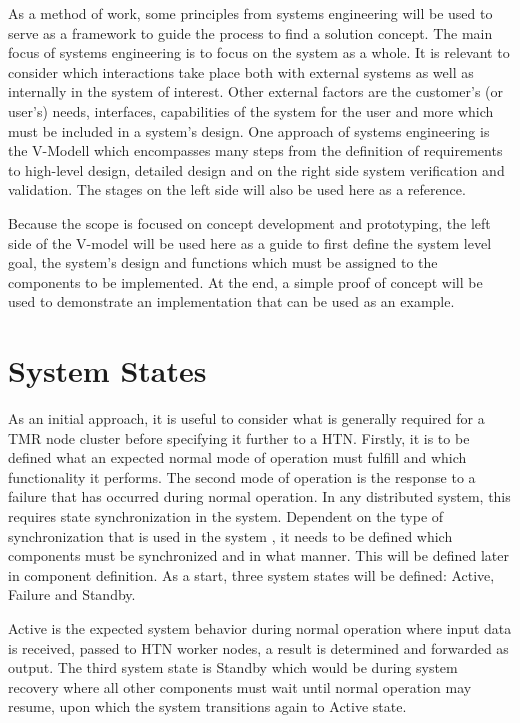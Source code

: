 
As a method of work, some principles from systems engineering will be used to serve as a framework to guide the process to find a solution concept. The main focus of systems engineering is to focus on the system as a whole. It is relevant to consider which interactions take place both with external systems as well as internally in the system of interest. Other external factors are the customer's (or user's) needs, interfaces, capabilities of the system for the user and more which must be included in a system's design. One approach of systems engineering is the V-Modell which encompasses many steps from the definition of requirements to high-level design, detailed design and on the right side system verification and validation. The stages on the left side will also be used here as a reference. \parencite{kossiakoff_systems_2020}

Because the scope is focused on concept development and prototyping, the left side of the V-model will be used here as a guide to first define the system level goal, the system's design and functions which must be assigned to the components to be implemented. At the end, a simple proof of concept will be used to demonstrate an implementation that can be used as an example.




\section{System States}

As an initial approach, it is useful to consider what is generally required for a TMR node cluster before specifying it further to a HTN. Firstly, it is to be defined what an expected normal mode of operation must fulfill and which functionality it performs. The second mode of operation is the response to a failure that has occurred during normal operation. In any distributed system, this requires state synchronization in the system. Dependent on the type of synchronization that is used in the system \parencite{viotti_consistency_2017}, it needs to be defined which components must be synchronized and in what manner. This will be defined later in component definition. As a start, three system states will be defined: Active, Failure and Standby.

Active is the expected system behavior during normal operation where input data is received, passed to HTN worker nodes, a result is determined and forwarded as output. The third system state is Standby which would be during system recovery where all other components must wait until normal operation may resume, upon which the system transitions again to Active state.


